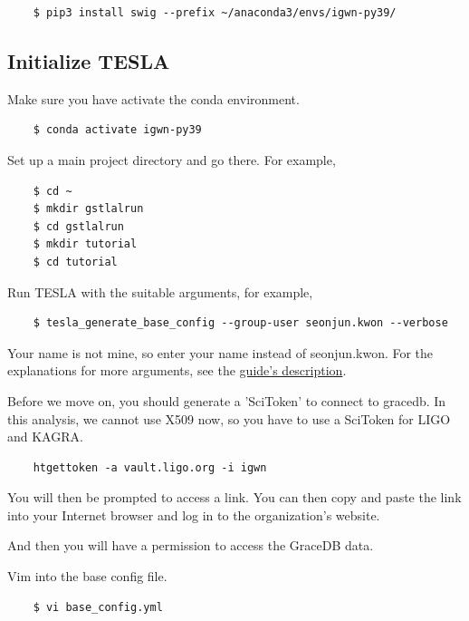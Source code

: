 \begin{verbatim}
    $ pip3 install swig --prefix ~/anaconda3/envs/igwn-py39/
\end{verbatim}

\subsection{Initialize TESLA}

Make sure you have activate the conda environment.

\begin{verbatim}
    $ conda activate igwn-py39
\end{verbatim}

Set up a main project directory and go there. For example,

\begin{verbatim}
    $ cd ~
    $ mkdir gstlalrun
    $ cd gstlalrun
    $ mkdir tutorial
    $ cd tutorial
\end{verbatim}

Run TESLA with the suitable arguments, for example,

\begin{verbatim}
    $ tesla_generate_base_config --group-user seonjun.kwon --verbose
\end{verbatim}

Your name is not mine, so enter your name instead of seonjun.kwon. For the explanations for more arguments, see the \href{https://git.ligo.org/alvin.li/tesla/-/tree/o4a_version_1.0#setting-up-a-tesla-analysis}{guide's description}.

Before we move on, you should generate a 'SciToken' to connect to gracedb. In this analysis, we cannot use X509 now, so you have to use a SciToken for LIGO and KAGRA.

\begin{verbatim}
    htgettoken -a vault.ligo.org -i igwn
\end{verbatim}

You will then be prompted to access a link. You can then copy and paste the link into your Internet browser and log in to the organization's website.

And then you will have a permission to access the GraceDB data.

Vim into the base config file.

\begin{verbatim}
    $ vi base_config.yml
\end{verbatim}

